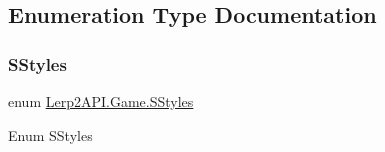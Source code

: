 \subsection{Enumeration Type Documentation}
\mbox{\label{namespace_lerp2_a_p_i_1_1_game_a40a896b145d802bb883b777ab7413d7b}} 
\subsubsection{\texorpdfstring{S\+Styles}{SStyles}}
{\footnotesize\ttfamily enum \hyperlink{namespace_lerp2_a_p_i_1_1_game_a40a896b145d802bb883b777ab7413d7b}{Lerp2\+A\+P\+I.\+Game.\+S\+Styles}\hspace{0.3cm}{\ttfamily [strong]}}



Enum S\+Styles 

